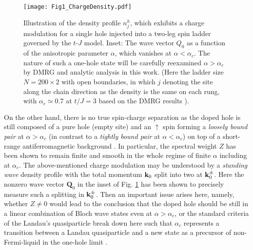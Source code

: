 \documentclass[aps,prb,twocolumn,notitlepage,superscriptaddress,showpacs]{revtex4-1}
\begin{document}
\begin{figure}[tbp]
\begin{center}
\texttt{[image: Fig1\_ChargeDensity.pdf]}
\end{center}
\par
\renewcommand{\figurename}{Fig.}
\caption{Illustration of the density profile $n^h_j$, which exhibits a charge modulation for a single hole injected into a two-leg spin ladder governed by the $t$-$J$ model. Inset: The wave vector $Q_0$ as a function of the anisotropic parameter $\alpha$, which vanishes at $\alpha<\alpha_c$. The nature of such a one-hole state will be carefully reexamined $\alpha>\alpha_c$ by DMRG and analytic analysis in this work. (Here the ladder size $N=200\times 2$ with open boundaries, in which $j$ denoting the site along the chain direction as the density is the same on each rung, with $\alpha_c\simeq 0.7$ at $t/J=3$ based on the DMRG results \cite{ZZ2014cm}).
 }
\label{Fig0}
\end{figure}

On the other hand, there is no true spin-charge separation \cite{WSK2015} as the doped hole is still composed of a pure hole (empty site) and an $\uparrow$ spin forming a \emph {loosely bound pair} at $\alpha>\alpha_c$ (in contrast to a \emph {tightly bound pair} at $\alpha<\alpha_c$) on top of a short-range antiferromagnetic background \cite{ZZ2014qp,WSK2015}. In particular, the spectral weight $Z$ has been shown \cite{WSK2015} to remain finite and smooth in the whole regime of finite $\alpha$ including at $\alpha_c$. The above-mentioned charge modulation may be understood \cite{ZZ2014cm,WSK2015} by a \emph{standing wave} density profile with the total momentum ${\bf k}_0$ split into two at ${\bf k}_0^{\pm}$. Here the nonzero wave vector ${\textbf{Q}}_0$ in the inset of Fig. \ref{Fig0} has been shown \cite{ZZ2014cm} to precisely measure such a splitting in ${\bf k}_0^{\pm}$. Then an important issue arises here, namely, whether $Z\neq 0$ would lead to the conclusion \cite{WSK2015} that the doped hole should be still in a linear combination of Bloch wave states even at $\alpha>\alpha_c$, or the standard criteria of the Landau's quasiparticle break down here such that $\alpha_c$ represents a transition between a Landau quasiparticle and a new state as a precursor of non-Fermi-liquid in the one-hole limit \cite{ZZ2013,ZZ2014qp,ZZ2014cm}.
\end{document}
